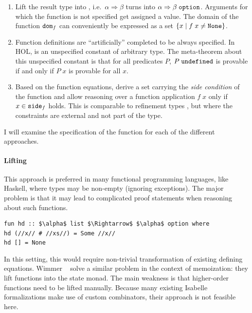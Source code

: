 \begin{enumerate}
  \item
    Lift the result type into , i.e.\ $\alpha \Rightarrow \beta$ turns into $\alpha \Rightarrow \beta\;\texttt{\textup{option}}$.
    Arguments for which the function is not specified get assigned a  value.
    The domain of the function $\texttt{\textup{dom}}_f$ can conveniently be expressed as a set $\{ x \mid f\;x \neq \texttt{\textup{None}} \}$.
  \item
    Function definitions are ``artificially'' completed to be always specified.
    In HOL,  is an unspecified constant of arbitrary type.
    The meta-theorem about this unspecified constant is that for all predicates $P$, $P\;\texttt{\textup{undefined}}$ is provable if and only if $P\;x$ is provable for all $x$.
  \item
    Based on the function equations, derive a set carrying the \emph{side condition} of the function and allow reasoning over a function application $f\;x$ only if $x \in \texttt{\textup{side}}_f$ holds.
    This is comparable to refinement types \cite{gordon2010refinement}, but where the constraints are external and not part of the type.
\end{enumerate}

\noindent
I will examine the specification of the  function for each of the different approaches.

\paragraph{Lifting}
This approach is preferred in many functional programming languages, like Haskell, where types may be non-empty (ignoring exceptions).
The major problem is that it may lead to complicated proof statements when reasoning about such functions.
%
\begin{lstlisting}[language=Isabelle]
fun hd :: $\alpha$ list $\Rightarrow$ $\alpha$ option where
hd (//x// # //xs//) = Some //x//
hd [] = None
\end{lstlisting}
%
In this setting, this would require non-trivial transformation of existing defining equations.
Wimmer \etal~\cite{wimmer2018memoization} solve a similar problem in the context of memoization: they lift functions into the state monad.
The main weakness is that higher-order functions need to be lifted manually.
Because many existing Isabelle formalizations make use of custom combinators, their approach is not feasible here.

